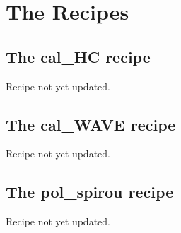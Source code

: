 \chapter{The Recipes}
\label{ch:the_recipes}






















\clearpage
\newpage
\section{The cal\_HC recipe}
\label{ch:the_recipes:cal_HC_E2DS_spirou}

Recipe not yet updated.


\section{The cal\_WAVE recipe}
\label{ch:the_recipes:cal_WAVE_E2DS_spirou}

Recipe not yet updated.


\section{The pol\_spirou recipe}
\label{ch:the_recipes:pol_spirou}

Recipe not yet updated.
